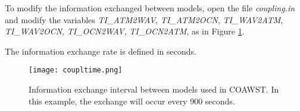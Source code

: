  To modify the information exchanged between models, open the file \textit{coupling.in} and
modify the variables \textit{TI\_ATM2WAV}, \textit{TI\_ATM2OCN}, \textit{TI\_WAV2ATM}, \textit{TI\_WAV2OCN}, \textit{TI\_OCN2WAV},
          \textit{TI\_OCN2ATM}, as in Figure \textcolor{bleu_cite}{\ref{taxaacopla}}.
\bigskip

\begin{tcolorbox}[enhanced,
  grow to left by=0cm,%
  grow to right by=0cm,%
  enlarge top by=0cm,%
  enlarge bottom by=0cm,%
  tcbox raise base,
  boxrule=1.0pt,
  left=18mm,
  colframe=yellow!50!black,coltext=yellow!25!black,colback=yellow!10!white,
  overlay={\begin{tcbclipinterior}\fill[yellow!75!blue!50!white] (frame.south west)
    rectangle node[text=white,font=\sffamily\bfseries\footnotesize,rotate=0] {ATTENTION} ([xshift=18mm]frame.north west);\end{tcbclipinterior}}]
    The information exchange rate is defined in seconds.
\end{tcolorbox}
\bigskip

\begin{figure}[H]
    \centering
    \texttt{[image: coupltime.png]}
    \caption{Information exchange interval between models used in COAWST. In this example, the exchange will occur every 900 seconds.}
    \label{taxaacopla}
\end{figure}
\bigskip
